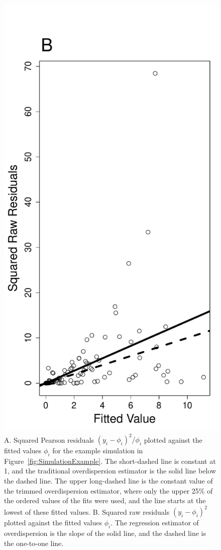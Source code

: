 \documentclass[12pt, titlepage]{article}\usepackage[]{graphicx}\usepackage[]{color}
\makeatletter
\def\maxwidth{ %
  \ifdim\Gin@nat@width>\linewidth
    \linewidth
  \else
    \Gin@nat@width
  \fi
}
\makeatother
\begin{document}
\begin{figure}[H]
\begin{center}
		\includegraphics[width = .40\maxwidth]{figure/rawResids4Overdisp}
		\end{center}
		\caption{A. Squared Pearson residuals $(y_i-\phi_i)^2/\phi_i$ plotted against the fitted values $\phi_i$ for the example simulation in Figure~\ref{fig:SimulationExample}. The short-dashed line is constant at 1, and the traditional overdispersion estimator is the solid line below the dashed line.  The upper long-dashed line is the constant value of the trimmed overdispersion estimator, where only the upper 25\% of the ordered values of the fits were used, and the line starts at the lowest of these fitted values.  B. Squared raw residuals $(y_i-\phi_i)^2$ plotted against the fitted values $\phi_i$. The regression estimator of overdispersion is the slope of the solid line, and the dashed line is the one-to-one line.  \label{fig:residDisp}}
		\end{figure}
\end{document}
